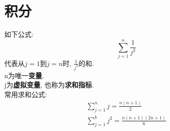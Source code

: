 \chapter{积分}
如下公式:
\[\sum_{j=1}^n\frac{1}{j^2}\]
代表从$j=1$到$j=n$时, $\displaystyle\frac{1}{j^2}$的和.\\
n为唯一\textbf{变量}.\\
j为\textbf{虚拟变量}, 也称为\textbf{求和指标}.\\[2ex]

常用求和公式:
\begin{gather}
\sum_{j=1}^n j=\frac{n(n+1)}{2}\nonumber\\
\sum_{j=1}^b j^2=\frac{n(n+1)(2n+1)}{6}\nonumber
\end{gather}
